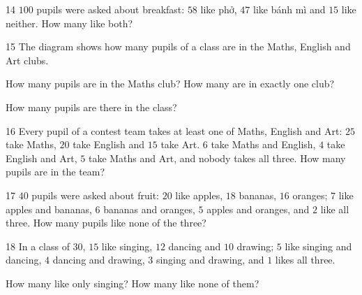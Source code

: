 \gap
\begin{probbox}{14}{\relax}
$100$ pupils were asked about breakfast: $58$ like phở, $47$ like bánh mì and $15$ like neither. How many like both?
\end{probbox}
\gap
\needspace{7.5cm}
\begin{probbox}{15}{\relax}
The diagram shows how many pupils of a class are in the Maths, English and Art clubs.
\begin{center}
\end{center}
 How many pupils are in the Maths club? \quad {} How many are in exactly one club?\par
{} How many pupils are there in the class?
\end{probbox}
\gap
\begin{probbox}{16}{\relax}
Every pupil of a contest team takes at least one of Maths, English and Art: $25$ take Maths, $20$ take English and $15$ take Art. $6$ take Maths and English, $4$ take English and Art, $5$ take Maths and Art, and nobody takes all three. How many pupils are in the team?
\end{probbox}
\gap
\begin{probbox}{17}{\relax}
$40$ pupils were asked about fruit: $20$ like apples, $18$ bananas, $16$ oranges; $7$ like apples and bananas, $6$ bananas and oranges, $5$ apples and oranges, and $2$ like all three. How many pupils like none of the three?
\end{probbox}
\gap
\begin{probbox}{18}{\relax}
In a class of $30$, $15$ like singing, $12$ dancing and $10$ drawing; $5$ like singing and dancing, $4$ dancing and drawing, $3$ singing and drawing, and $1$ likes all three.\par
{} How many like only singing? \quad {} How many like none of them?
\end{probbox}
